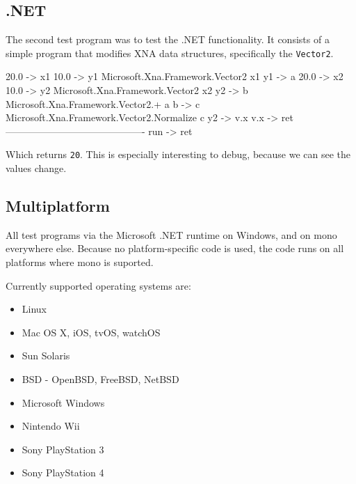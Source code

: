 \subsection{.NET}
The second test program was to test the .NET functionality.
It consists of a simple program that modifies XNA data structures, specifically the \verb|Vector2|.

\begin{MC}
20.0 -> x1
10.0 -> y1
Microsoft.Xna.Framework.Vector2 x1 y1 -> a
20.0 -> x2
10.0 -> y2
Microsoft.Xna.Framework.Vector2 x2 y2 -> b
Microsoft.Xna.Framework.Vector2.+ a b -> c
Microsoft.Xna.Framework.Vector2.Normalize c
y2 -> v.x 
v.x -> ret
-------------------------------------------
run -> ret
\end{MC}

Which returns \verb|20|.
This is especially interesting to debug, because we can see the values change.


\subsection{Multiplatform}
All test programs via the Microsoft .NET runtime on Windows, and on mono everywhere else.
Because no platform-specific code is used, the code runs on all platforms where mono is suported\cite{mono_platforms}.

Currently supported operating systems are:
\begin{itemize}
    \item Linux
    \item Mac OS X, iOS, tvOS, watchOS
    \item Sun Solaris
    \item BSD - OpenBSD, FreeBSD, NetBSD
    \item Microsoft Windows
    \item Nintendo Wii
    \item Sony PlayStation 3
    \item Sony PlayStation 4
\end{itemize}

